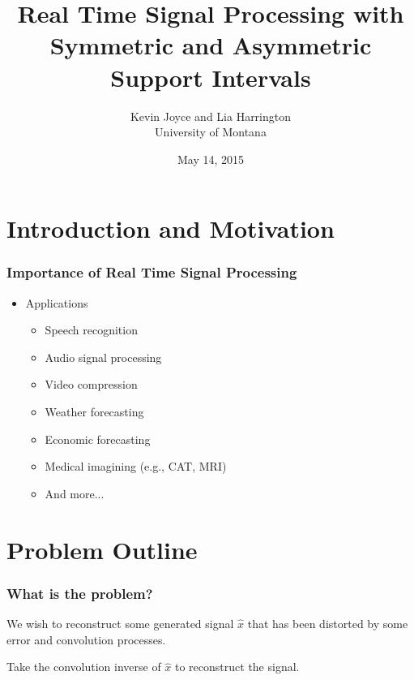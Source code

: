 \documentclass[t]{beamer}
\title{Real Time Signal Processing with Symmetric and Asymmetric Support Intervals}
\author{Kevin Joyce and Lia Harrington \\
       University of Montana}
\date{May 14, 2015}
\begin{document}
\begin{frame}
\titlepage
\end{frame}
\section{Introduction and Motivation}
\begin{frame}
\frametitle{Importance of Real Time Signal Processing}
\vspace{.3cm}
\vspace{.3cm}
\begin{itemize}
\item Applications
\begin{itemize}
\item Speech recognition
\item Audio signal processing
\item Video compression
\item Weather forecasting
\item Economic forecasting
\item Medical imagining (e.g., CAT, MRI)
\item And more...
\end{itemize}
\end{itemize}
\end{frame}
\section{Problem Outline}
\begin{frame}
\frametitle{What is the problem?}
 We wish to reconstruct some generated signal $\hat{x}$ that has been distorted by some error and convolution processes. \newline \vspace{.5cm}

 Take the convolution inverse of $\hat{x}$ to reconstruct the signal. 
\end{frame}
\end{document}
